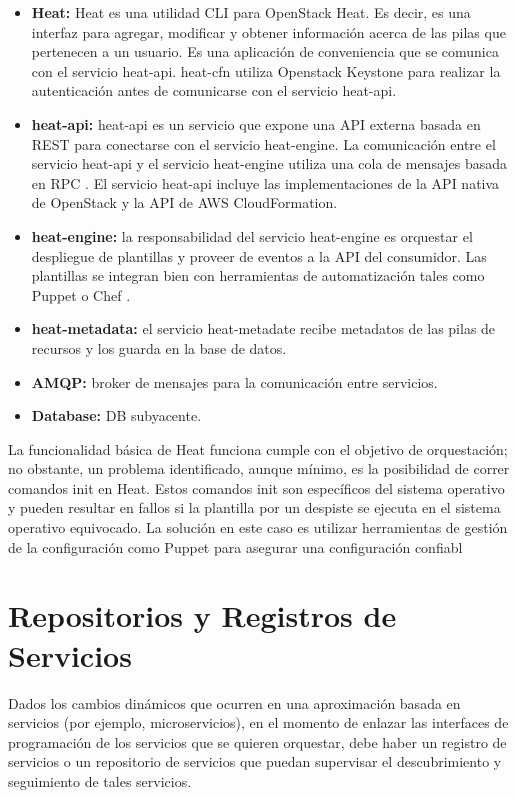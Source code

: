 \begin{itemize}
\item \textbf{Heat:} Heat es una utilidad CLI para OpenStack Heat. Es decir, es una interfaz para agregar, modificar y obtener información acerca de las pilas que pertenecen a un usuario. Es una aplicación de conveniencia que se comunica con el servicio heat-api. heat-cfn utiliza Openstack Keystone para realizar la autenticación antes de comunicarse con el servicio heat-api.
\item \textbf{heat-api:} heat-api es un servicio que expone una API externa basada en REST \cite{Richardson2008-ng} para conectarse con el servicio heat-engine. La comunicación entre el servicio heat-api y el servicio heat-engine utiliza una cola de mensajes basada en RPC \cite{Arpaci-Dusseau2015-px}. El servicio heat-api incluye las implementaciones de la API nativa de OpenStack y la API de AWS CloudFormation.
\item \textbf{heat-engine:} la responsabilidad del servicio heat-engine es orquestar el despliegue de plantillas y proveer de eventos a la API del consumidor. Las plantillas se integran bien con herramientas de automatización tales como Puppet \cite{Puppet2016-ao} o Chef \cite{Chef2016-cc}.
\item \textbf{heat-metadata:} el servicio heat-metadate recibe metadatos de las pilas de recursos y los guarda en la base de datos.
\item \textbf{AMQP:} broker de mensajes para la comunicación entre servicios.
\item \textbf{Database:} DB subyacente.
\end{itemize}

La funcionalidad básica de Heat funciona cumple con el objetivo de orquestación; no obstante, un problema identificado, aunque mínimo, es la posibilidad de correr comandos init en Heat. Estos comandos init son específicos del sistema operativo y pueden resultar en fallos si la plantilla por un despiste se ejecuta en el sistema operativo equivocado. La solución en este caso es utilizar herramientas de gestión de la configuración como Puppet para asegurar una configuración confiabl

\section{Repositorios y Registros de Servicios}
Dados los cambios dinámicos que ocurren en una aproximación basada en servicios (por ejemplo, microservicios), en el momento de enlazar las interfaces de programación de los servicios que se quieren orquestar, debe haber un registro de servicios o un repositorio de servicios que puedan supervisar el descubrimiento y seguimiento de tales servicios.

